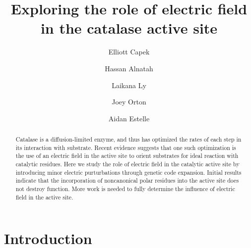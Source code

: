 \documentclass[journal=jacsat,manuscript=article]{achemso}
\author{Elliott Capek}
\affiliation{Department of Biochemistry, Oregon State University}
\author{Hassan Alnatah}
\author{Laikana Ly}
\author{Joey Orton}
\author{Aidan Estelle}
\title[]{Exploring the role of electric field in the catalase active site}
\begin{document}
\begin{abstract}
  Catalase is a diffusion-limited enzyme, and thus has optimized the rates of each step in its interaction with substrate. Recent evidence suggests that one such optimization is the use of an electric field in the active site to orient substrates for ideal reaction with catalytic residues. Here we study the role of electric field in the catalytic active site by introducing minor electric purturbations through genetic code expansion. Initial results indicate that the incorporation of noncanonical polar residues into the active site does not destroy function. More work is needed to fully determine the influence of electric field in the active site.\\
\end{abstract}

\section{Introduction}
\end{document}
